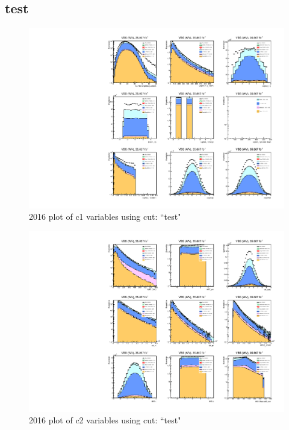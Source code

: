 \documentclass{article}
\begin{document}
      \subsection*{test}
                    \begin{figure}[H]
                        \centering
                        \caption{2016 plot of c1 variables using cut: ``test"}
                        \includegraphics[width=\textwidth]{2016/c1_2016_test.pdf}
                    \end{figure}    
                    \begin{figure}[H]
                        \centering
                        \caption{2016 plot of c2 variables using cut: ``test"}
                        \includegraphics[width=\textwidth]{2016/c2_2016_test.pdf}
                    \end{figure}    
\end{document}
